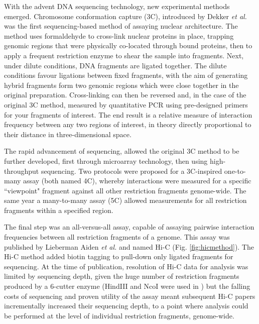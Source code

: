 \documentclass[a4paper,11pt,oneside]{book}
\begin{document}
With the advent DNA sequencing technology, new experimental methods emerged. Chromosome conformation capture (3C), introduced by Dekker \emph{et al.}\cite{Dekker2002} was the first sequencing-based method of assaying nuclear architecture. The method uses formaldehyde to cross-link nuclear proteins in place, trapping genomic regions that were physically co-located through bound proteins, then to apply a frequent restriction enzyme to shear the sample into fragments. Next, under dilute conditions, DNA fragments are ligated together. The dilute conditions favour ligations between fixed fragments, with the aim of generating hybrid fragments form two genomic regions which were close together in the original preparation. Cross-linking can then be reversed and, in the case of the original 3C method, measured by quantitative PCR using pre-designed primers for your fragments of interest. The end result is a relative measure of interaction frequency between any two regions of interest, in theory directly proportional to their distance in three-dimensional space.

The rapid advancement of sequencing, allowed the original 3C method to be further developed, first through microarray technology, then using high-throughput sequencing. Two protocols were proposed for a 3C-inspired one-to-many assay\cite{Zhao2006, Simonis2006} (both named 4C), whereby interactions were measured for a specific ``viewpoint" fragment against all other restriction fragments genome-wide. The same year a many-to-many assay (5C) allowed measurements for all restriction fragments within a specified region.\cite{Dostie2006} 

The final step was an all-versus-all assay, capable of assaying pairwise interaction frequencies between all restriction fragments of a genome. This assay was published by Lieberman Aiden \emph{et al.}\cite{Lieberman2009} and named Hi-C (Fig. \ref{fig:hicmethod}). The Hi-C method added biotin tagging to pull-down only ligated fragments for sequencing. At the time of publication, resolution of Hi-C data for analysis was limited by sequencing depth, given the huge number of restriction fragments produced by a 6-cutter enzyme (HindIII and NcoI were used in \cite{Lieberman2009}) but the falling costs of sequencing and proven utility of the assay meant subsequent Hi-C papers incrementally increased their sequencing depth, to a point where analysis could be performed at the level of individual restriction fragments, genome-wide.\cite{Dixon2012,  Selvaraj2013a, Jin2013, Rao2014}
\end{document}
